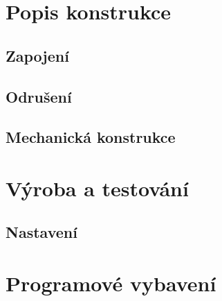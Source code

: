 \documentclass[12pt,a4paper,final,titlepage,twoside]{article}
\begin{document}



\section{Popis konstrukce}

\subsection{Zapojení}


\subsection{Odrušení}

\subsection{Mechanická konstrukce}

\section{Výroba a testování}


\subsection{Nastavení}

\section{Programové vybavení}
\end{document}
